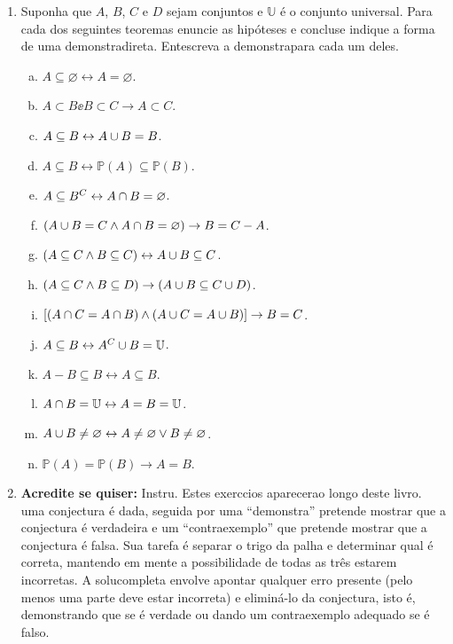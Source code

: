 \begin{enumerate}[{\bf 1.}]
\item \label{conjuntos6} Suponha que $A$, $B$, $C$ e $D$ sejam conjuntos e $\mathbb{U}$ \'e o conjunto universal. Para cada dos seguintes teoremas enuncie as hip\'oteses e conclus\aoi e indique a forma de uma demonstra\cao direta. Ent\ao escreva a demonstra\cao para cada um deles.
\begin{enumerate}[a)]
\item $A\subseteq\varnothing\leftrightarrow A=\varnothing$.
\item $A\subset B\ee B\subset C\to A\subset C$.
\item $A\subseteq B\leftrightarrow A\cup B=B$.
\item $A\subseteq B\leftrightarrow \mathbb{P}(A)\subseteq\mathbb{P}(B)$.
\item $A\subseteq B^C\leftrightarrow A\cap B=\varnothing$.
\item $(A\cup B=C\wedge A\cap B=\varnothing)\to B=C-A$.
\item $(A\subseteq C\wedge B\subseteq C)\leftrightarrow A\cup B\subseteq C$.
\item $(A\subseteq C\wedge B\subseteq D)\to(A\cup B\subseteq C\cup D)$.
\item $[(A\cap C=A\cap B)\wedge(A\cup C=A\cup B)]\to B=C$.
\item $A\subseteq B\leftrightarrow A^C\cup B=\mathbb{U}$.
\item $A-B\subseteq B\leftrightarrow A\subseteq B$.
\item $A\cap B=\mathbb{U}\leftrightarrow A=B=\mathbb{U}$.
\item $A\cup B\neq\varnothing\leftrightarrow A\neq\varnothing \vee B\neq\varnothing $.
\item $\mathbb{P}(A)=\mathbb{P}(B)\to A=B$.
\end{enumerate}

\item {\bf Acredite se quiser:} Instru\cois. Estes exerc\ih cios aparecer\ao ao longo deste livro. uma conjectura \'e dada, seguida por uma ``demonstra\caoi'' pretende mostrar que a conjectura \'e verdadeira e um ``contraexemplo'' que pretende mostrar que a conjectura \'e falsa. Sua tarefa \'e separar o trigo da palha e determinar qual \'e correta, mantendo em mente a possibilidade de todas as tr\^es estarem incorretas. A solu\cao completa envolve apontar qualquer erro presente (pelo menos uma parte deve estar incorreta) e elimin\'a-lo da conjectura, isto \'e, demonstrando que se  \'e verdade ou dando um contraexemplo adequado se \'e falso. 


\end{enumerate}

